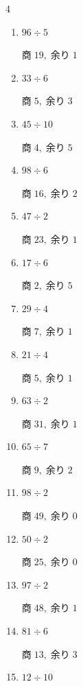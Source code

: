 \begin{multicols}{4}
\begin{enumerate}
        $商\; 11,\; 余り\; 0$

  \item $96 \div 5$

        $商\; 19,\; 余り\; 1$

  \item $33 \div 6$

        $商\; 5,\; 余り\; 3$

  \item $45 \div 10$

        $商\; 4,\; 余り\; 5$

  \item $98 \div 6$

        $商\; 16,\; 余り\; 2$

  \item $47 \div 2$

        $商\; 23,\; 余り\; 1$

  \item $17 \div 6$

        $商\; 2,\; 余り\; 5$

  \item $29 \div 4$

        $商\; 7,\; 余り\; 1$

  \item $21 \div 4$

        $商\; 5,\; 余り\; 1$

  \item $63 \div 2$

        $商\; 31,\; 余り\; 1$

  \item $65 \div 7$

        $商\; 9,\; 余り\; 2$

  \item $98 \div 2$

        $商\; 49,\; 余り\; 0$

  \item $50 \div 2$

        $商\; 25,\; 余り\; 0$

\columnbreak %

\resetques

  \item $97 \div 2$

        $商\; 48,\; 余り\; 1$

  \item $81 \div 6$

        $商\; 13,\; 余り\; 3$

  \item $12 \div 10$


\end{enumerate}
\end{multicols}
